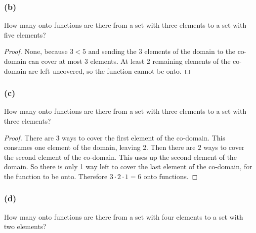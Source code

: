 \documentclass[14pt]{extarticle}
\begin{document}
\subsubsection{(b)}
How many onto functions are there from a set with three elements to a set with five elements?

\begin{proof}
     None, because \(3 < 5\) and sending the 3 elements of the domain to the co-domain can cover at most 3 elements. At least
     2 remaining elements of the co-domain are left uncovered, so the function cannot be onto.
\end{proof}

\subsubsection{(c)}
How many onto functions are there from a set with three elements to a set with three elements?

\begin{proof}
     There are 3 ways to cover the first element of the co-domain. This consumes one element of the domain, leaving 2. Then there
     are 2 ways to cover the second element of the co-domain. This uses up the second element of the domain. So there is only 1
     way left to cover the last element of the co-domain, for the function to be onto. Therefore \(3 \cdot 2 \cdot 1 = 6\) onto
     functions.
\end{proof}

\subsubsection{(d)}
How many onto functions are there from a set with four elements to a set with two elements?
\end{document}
